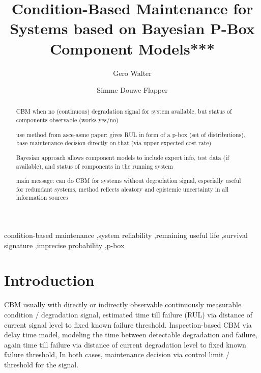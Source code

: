 \documentclass[authoryear]{elsarticle}
\begin{document}

\begin{frontmatter}
\title{Condition-Based Maintenance for Systems based on Bayesian P-Box Component Models***}

\author[tue]{Gero Walter}
\author[tue]{Simme Douwe Flapper}

\address[tue]{School of Industrial Engineering, Eindhoven University of Technology, Eindhoven, Netherlands}


\begin{abstract}
CBM when no (continuous) degradation signal for system available, but status of components observable (works yes/no)

use method from asce-asme paper:
gives RUL in form of a p-box (set of distributions), base maintenance decision directly on that
(via upper expected cost rate)

Bayesian approach allows
component models to include expert info, test data (if available), and status of components in the running system

main message: can do CBM for systems without degradation signal,
especially useful for redundant systems,
method reflects aleatory and epistemic uncertainty in all information sources
\end{abstract}

\begin{keyword}
condition-based maintenance \sep system reliability \sep remaining useful life \sep survival signature \sep imprecise probability \sep p-box
\end{keyword}
\end{frontmatter}



\section{Introduction}
\label{intro}

CBM usually with directly or indirectly observable continuously measurable condition / degradation signal,
estimated time till failure (RUL) via distance of current signal level to fixed known failure threshold.
Inspection-based CBM via delay time model, modeling the time between detectable degradation and failure,
again time till failure via distance of current degradation level to fixed known failure threshold,
In both cases, maintenance decision via control limit / threshold for the signal.
\end{document}
